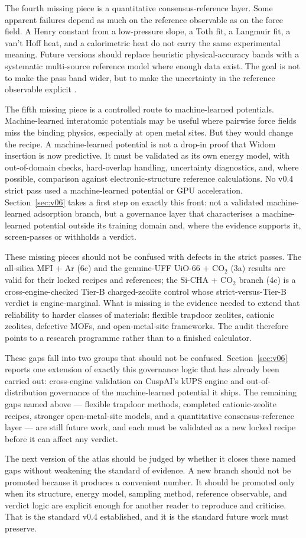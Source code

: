 The fourth missing piece is a quantitative consensus-reference layer. Some apparent failures depend as much on the reference observable as on the force field. A Henry constant from a low-pressure slope, a Toth fit, a Langmuir fit, a van't Hoff heat, and a calorimetric heat do not carry the same experimental meaning. Future versions should replace heuristic physical-accuracy bands with a systematic multi-source reference model where enough data exist. The goal is not to make the pass band wider, but to make the uncertainty in the reference observable explicit \cite{McCready2024JCTC}.

The fifth missing piece is a controlled route to machine-learned potentials. Machine-learned interatomic potentials may be useful where pairwise force fields miss the binding physics, especially at open metal sites. But they would change the recipe. A machine-learned potential is not a drop-in proof that Widom insertion is now predictive. It must be validated as its own energy model, with out-of-domain checks, hard-overlap handling, uncertainty diagnostics, and, where possible, comparison against electronic-structure reference calculations. No v0.4 strict pass used a machine-learned potential or GPU acceleration. Section~\ref{sec:v06} takes a first step on exactly this front: not a validated machine-learned adsorption branch, but a governance layer that characterises a machine-learned potential outside its training domain and, where the evidence supports it, screen-passes or withholds a verdict.

These missing pieces should not be confused with defects in the strict passes. The all-silica MFI + Ar (6c) and the genuine-UFF UiO-66 + CO\(_2\) (3a) results are valid for their locked recipes and references; the Si-CHA + CO\(_2\) branch (4c) is a cross-engine-checked Tier-B charged-zeolite control whose strict-versus-Tier-B verdict is engine-marginal. What is missing is the evidence needed to extend that reliability to harder classes of materials: flexible trapdoor zeolites, cationic zeolites, defective MOFs, and open-metal-site frameworks. The audit therefore points to a research programme rather than to a finished calculator.

These gaps fall into two groups that should not be confused. Section~\ref{sec:v06} reports one extension of exactly this governance logic that has already been carried out: cross-engine validation on CuspAI's kUPS engine and out-of-distribution governance of the machine-learned potential it ships. The remaining gaps named above --- flexible trapdoor methods, completed cationic-zeolite recipes, stronger open-metal-site models, and a quantitative consensus-reference layer --- are still future work, and each must be validated as a new locked recipe before it can affect any verdict.

The next version of the atlas should be judged by whether it closes these named gaps without weakening the standard of evidence. A new branch should not be promoted because it produces a convenient number. It should be promoted only when its structure, energy model, sampling method, reference observable, and verdict logic are explicit enough for another reader to reproduce and criticise. That is the standard v0.4 established, and it is the standard future work must preserve.
